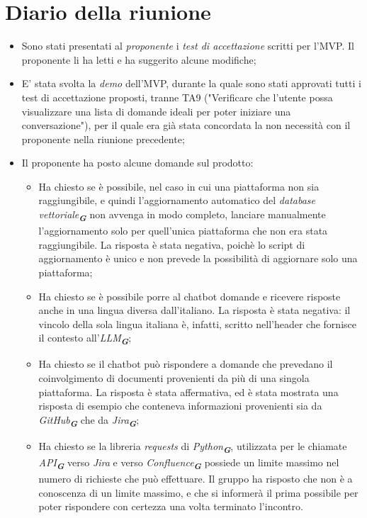 
\section{Diario della riunione}

\begin{itemize}
    \item Sono stati presentati al \emph{proponente} i \emph{test di accettazione} scritti per l'MVP. Il proponente li ha letti e ha suggerito alcune modifiche;
    \item E' stata svolta la \emph{demo} dell'MVP, durante la quale sono stati approvati tutti i test di accettazione proposti, tranne TA9 ("Verificare che l'utente possa visualizzare una lista di domande ideali per poter iniziare una conversazione"), per il quale era già stata concordata la non necessità con il proponente nella riunione precedente;
    \item Il proponente ha posto alcune domande sul prodotto:
    \begin{itemize}
        \item Ha chiesto se è possibile, nel caso in cui una piattaforma non sia raggiungibile, e quindi l'aggiornamento automatico del \emph{database vettoriale}\textsubscript{\textbf{\textit{G}}} non avvenga  in modo completo, lanciare manualmente l'aggiornamento solo per quell'unica piattaforma che non era stata raggiungibile. La risposta è stata negativa, poichè lo script di aggiornamento è unico e non prevede la possibilità di aggiornare solo una piattaforma;
        \item Ha chiesto se è possibile porre al chatbot domande e ricevere risposte anche in una lingua diversa dall'italiano. La risposta è stata negativa: il vincolo della sola lingua italiana è, infatti, scritto nell'header che fornisce il contesto all'\emph{LLM}\textsubscript{\textbf{\textit{G}}};
        \item Ha chiesto se il chatbot può rispondere a domande che prevedano il coinvolgimento di documenti provenienti da più di una singola piattaforma. La risposta è stata affermativa, ed è stata mostrata una risposta di esempio che conteneva informazioni provenienti sia da \emph{GitHub}\textsubscript{\textbf{\textit{G}}} che da
        \emph{Jira}\textsubscript{\textbf{\textit{G}}};
        \item Ha chiesto se la libreria \emph{requests} di \emph{Python}\textsubscript{\textbf{\textit{G}}}, utilizzata per le chiamate \emph{API}\textsubscript{\textbf{\textit{G}}} verso \emph{Jira} e verso \emph{Confluence}\textsubscript{\textbf{\textit{G}}} possiede un limite massimo nel numero di richieste che può effettuare. Il gruppo ha risposto che non è a conoscenza di un limite massimo, e che si informerà il prima possibile per poter rispondere con certezza una volta terminato l'incontro.

\end{itemize}
\end{itemize}
